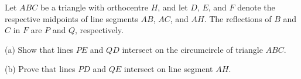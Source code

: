 Let $ABC$ be a triangle with orthocentre $H$,  and let $D$,  $E$,  and $F$ denote the respective midpoints of line segments $AB$,  $AC$,  and $AH$. The reflections of $B$ and $C$ in $F$ are $P$ and $Q$,  respectively.

(a) Show that lines $PE$ and $QD$ intersect on the circumcircle of triangle $ABC$.

(b) Prove that lines $PD$ and $QE$ intersect on line segment $AH$.